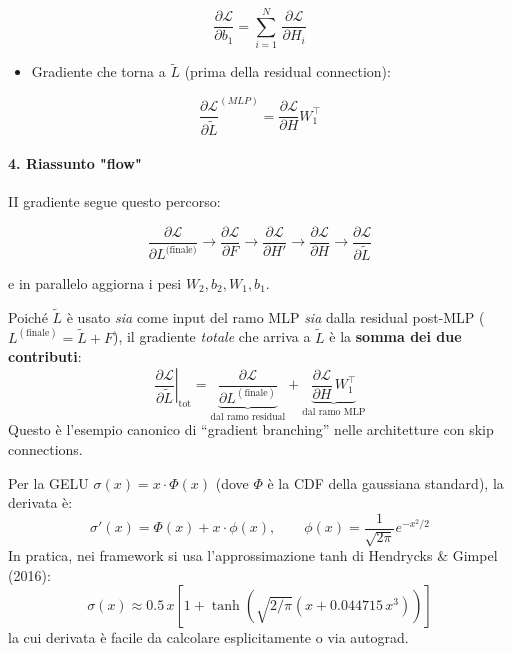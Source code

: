 \documentclass[
  11pt,
]{article}
\begin{document}
\[\frac{\partial\mathcal{L}}{\partial b_{1}} = \sum_{i = 1}^{N}\,\frac{\partial\mathcal{L}}{\partial H_{i}}\]


\begin{itemize}
\item
  Gradiente che torna a \(\widetilde{L}\) (prima della residual
  connection):
\end{itemize}


\[\frac{\partial\mathcal{L}}{\partial\widetilde{L}}^{(MLP)} = \frac{\partial\mathcal{L}}{\partial H}W_{1}^{\top}\]


\paragraph{4. \textbf{Riassunto "flow"}}


II gradiente segue questo percorso:

\[\frac{\partial\mathcal{L}}{\partial L^{\text{(finale)}}} \longrightarrow \frac{\partial\mathcal{L}}{\partial F} \longrightarrow \frac{\partial\mathcal{L}}{\partial H'} \longrightarrow \frac{\partial\mathcal{L}}{\partial H} \longrightarrow \frac{\partial\mathcal{L}}{\partial\widetilde{L}}\]

e in parallelo aggiorna i pesi \(W_{2},b_{2},W_{1},b_{1}\).

\begin{notabox}[title={\textbf{Attenzione: gradiente totale su $\widetilde{L}$}}]
Poiché $\widetilde{L}$ è usato \emph{sia} come input del ramo MLP \emph{sia} dalla residual post-MLP ($L^{(\text{finale})} = \widetilde{L} + F$), il gradiente \emph{totale} che arriva a $\widetilde{L}$ è la \textbf{somma dei due contributi}:
\[
\left.\frac{\partial\mathcal{L}}{\partial\widetilde{L}}\right|_{\text{tot}} = \underbrace{\frac{\partial\mathcal{L}}{\partial L^{(\text{finale})}}}_{\text{dal ramo residual}} + \underbrace{\frac{\partial\mathcal{L}}{\partial H}\, W_1^\top}_{\text{dal ramo MLP}}
\]
Questo è l'esempio canonico di ``gradient branching'' nelle architetture con skip connections.
\end{notabox}

\begin{notabox}[title={\textbf{GELU backward --- formula esplicita}}]
Per la GELU $\sigma(x) = x \cdot \Phi(x)$ (dove $\Phi$ è la CDF della gaussiana standard), la derivata è:
\[
\sigma'(x) = \Phi(x) + x \cdot \phi(x), \qquad \phi(x) = \frac{1}{\sqrt{2\pi}} e^{-x^2/2}
\]
In pratica, nei framework si usa l'approssimazione tanh di Hendrycks \& Gimpel (2016):
\[
\sigma(x) \approx 0.5 \, x \left[1 + \tanh\!\left(\sqrt{2/\pi}(x + 0.044715\, x^3)\right)\right]
\]
la cui derivata è facile da calcolare esplicitamente o via autograd.
\end{notabox}
\end{document}
